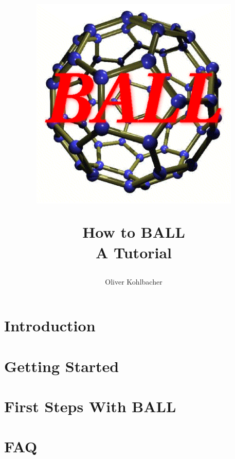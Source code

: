 \documentclass[12pt,twoside]{report}
\author{Oliver Kohlbacher}
\title{
	\begin{center}
		\includegraphics[width=10cm]{logo.eps}
	\end{center}
	\Huge How to BALL\\ 
	\Large A Tutorial
}
\begin{document}
\maketitle

\setcounter{page}{1}
\tableofcontents
{}
\setcounter{page}{1}

\chapter{Introduction}
\label{chapter:introduction}


\chapter{Getting Started}
\label{chapter:getting-started}




\chapter{First Steps With BALL}
\label{chapter:first-steps}




\chapter{FAQ}
\label{chapter:faq}



\newpage
{}
\printindex

\end{document}
